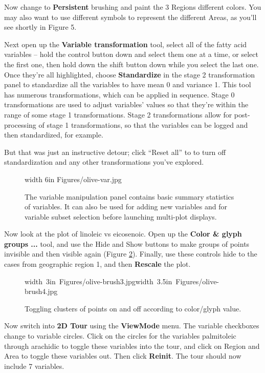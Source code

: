 \documentclass[11pt]{article}
\begin{document}
Now change to {\bf Persistent} brushing and paint the 3 Regions
different colors. You may also want to use different symbols to
represent the different Areas, as you'll see shortly in Figure 5.

Next open up the {\bf Variable transformation} tool, select all of
the fatty acid variables -- hold the control button down and select
them one at a time, or select the first one, then hold down the shift
button down while you select the last one.  Once they're all
highlighted, choose {\bf Standardize} in the stage 2 transformation
panel to standardize all the variables to have mean 0 and variance
1.  This tool has numerous transformations, which can be applied in
sequence.  Stage 0 transformations are used to adjust variables'
values so that they're within the range of some stage 1
transformations. Stage 2 transformations allow for post-processing of
stage 1 transformations, so that the variables can be logged and then
standardized, for example.

But that was just an instructive detour; click ``Reset all'' to
to turn off standardization and any other transformations you've
explored.

\begin{figure}[htp]
\pdfimage width 6in {Figures/olive-var.jpg}
\caption{The variable manipulation panel contains basic summary 
statistics of variables. It can also be used for adding new variables
and for variable subset selection before launching multi-plot
displays.
}%
\label{fig4}
\end{figure}

Now look at the plot of linoleic vs eicosenoic. Open up the {\bf
Color \& glyph groups ...} tool, and use the Hide and Show buttons to
make groups of points invisible and then visible again (Figure
\ref{fig5}). Finally, use these controls hide to the cases from
geographic region 1, and then {\bf Rescale} the plot.

\begin{figure}[htp]
\hbox{\pdfimage width 3in {Figures/olive-brush3.jpg}\pdfimage width 3.5in {Figures/olive-brush4.jpg}}
\caption{Toggling clusters of points on and off according to color/glyph value.}
\label{fig5}
\end{figure}

Now switch into {\bf 2D Tour} using the {\bf ViewMode} menu. The
variable checkboxes change to variable circles. Click on the circles
for the variables palmitoleic through arachidic to toggle these variables
into the tour, and click on Region and Area to toggle these variables out.
Then click {\bf Reinit}.  The tour should now include 7 variables.
\end{document}

